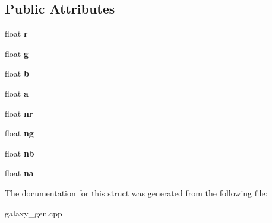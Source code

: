 \subsection*{Public Attributes}
\begin{DoxyCompactItemize}
\item 
float {\bfseries r}\hypertarget{structStarSystemGent_1_1Color_a41521b43ae65703d04abb69d056dc392}{}\label{structStarSystemGent_1_1Color_a41521b43ae65703d04abb69d056dc392}

\item 
float {\bfseries g}\hypertarget{structStarSystemGent_1_1Color_aef9ea4a3b1f03c614a2068897db49109}{}\label{structStarSystemGent_1_1Color_aef9ea4a3b1f03c614a2068897db49109}

\item 
float {\bfseries b}\hypertarget{structStarSystemGent_1_1Color_a39cb1e666a45b6e6792fb503b205d575}{}\label{structStarSystemGent_1_1Color_a39cb1e666a45b6e6792fb503b205d575}

\item 
float {\bfseries a}\hypertarget{structStarSystemGent_1_1Color_ad31c77de6041f93c1c4f6845dfab94de}{}\label{structStarSystemGent_1_1Color_ad31c77de6041f93c1c4f6845dfab94de}

\item 
float {\bfseries nr}\hypertarget{structStarSystemGent_1_1Color_a3cc1f2c7131fbb9927dd1520297a07d8}{}\label{structStarSystemGent_1_1Color_a3cc1f2c7131fbb9927dd1520297a07d8}

\item 
float {\bfseries ng}\hypertarget{structStarSystemGent_1_1Color_ae5ba2b1739fd83ed318826834166538c}{}\label{structStarSystemGent_1_1Color_ae5ba2b1739fd83ed318826834166538c}

\item 
float {\bfseries nb}\hypertarget{structStarSystemGent_1_1Color_a7cb742d80a697224fe3558ed0d8fa38f}{}\label{structStarSystemGent_1_1Color_a7cb742d80a697224fe3558ed0d8fa38f}

\item 
float {\bfseries na}\hypertarget{structStarSystemGent_1_1Color_a92b316346c5e863324b20455d3f2dd35}{}\label{structStarSystemGent_1_1Color_a92b316346c5e863324b20455d3f2dd35}

\end{DoxyCompactItemize}


The documentation for this struct was generated from the following file\+:\begin{DoxyCompactItemize}
\item 
galaxy\+\_\+gen.\+cpp\end{DoxyCompactItemize}
